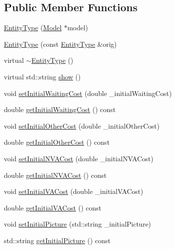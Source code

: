 \subsection*{Public Member Functions}
\begin{DoxyCompactItemize}
\item 
\hyperlink{class_entity_type_a76c09c732793a586dc3b474485e9824f}{Entity\+Type} (\hyperlink{class_model}{Model} $\ast$model)
\item 
\hyperlink{class_entity_type_a34b9576e2453ed309c75840319bbb2f8}{Entity\+Type} (const \hyperlink{class_entity_type}{Entity\+Type} \&orig)
\item 
virtual \hyperlink{class_entity_type_aee11e4242d000965f06018723bdf0946}{$\sim$\+Entity\+Type} ()
\item 
virtual std\+::string \hyperlink{class_entity_type_ab5a696912b12a9f51decded90f368dea}{show} ()
\item 
void \hyperlink{class_entity_type_affd1d2dd13149ae0989aae5cc9ea1e05}{set\+Initial\+Waiting\+Cost} (double \+\_\+initial\+Waiting\+Cost)
\item 
double \hyperlink{class_entity_type_a46dd0977b19bf167eeb12db97464b757}{get\+Initial\+Waiting\+Cost} () const 
\item 
void \hyperlink{class_entity_type_a32f126822c567a887a446a763db13d64}{set\+Initial\+Other\+Cost} (double \+\_\+initial\+Other\+Cost)
\item 
double \hyperlink{class_entity_type_ac5708811f5f6eaf7ac587fc88190b7f2}{get\+Initial\+Other\+Cost} () const 
\item 
void \hyperlink{class_entity_type_a935cac67adc2b13aa25290c3db04c847}{set\+Initial\+N\+V\+A\+Cost} (double \+\_\+initial\+N\+V\+A\+Cost)
\item 
double \hyperlink{class_entity_type_ae8b26deba82e687d5a07b863f750baf4}{get\+Initial\+N\+V\+A\+Cost} () const 
\item 
void \hyperlink{class_entity_type_aecd52de7178bb03be55798378d15d3e8}{set\+Initial\+V\+A\+Cost} (double \+\_\+initial\+V\+A\+Cost)
\item 
double \hyperlink{class_entity_type_a9833d4a85dcb5c5bd9db02e1e2e45dd9}{get\+Initial\+V\+A\+Cost} () const 
\item 
void \hyperlink{class_entity_type_ab3a19031f9b46b376bdd35aa3044c90e}{set\+Initial\+Picture} (std\+::string \+\_\+initial\+Picture)
\item 
std\+::string \hyperlink{class_entity_type_a9a464c546bc2f7fe56fbea9b761ac1f7}{get\+Initial\+Picture} () const 
\item 

\end{DoxyCompactItemize}
